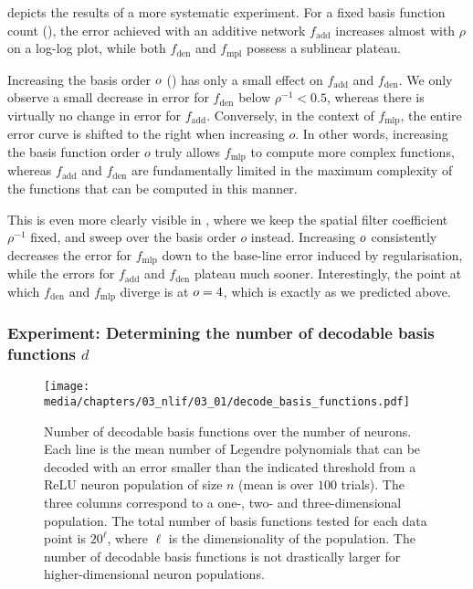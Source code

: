  depicts the results of a more systematic experiment.
For a fixed basis function count (), the error achieved with an additive network $f_\mathrm{add}$ increases almost with $\rho$ on a log-log plot, while both $f_\mathrm{den}$ and $f_\mathrm{mpl}$ possess a sublinear plateau.

Increasing the basis order $o$ () has only a small effect on $f_\mathrm{add}$ and $f_\mathrm{den}$.
We only observe a small decrease in error for $f_\mathrm{den}$ below $\rho^{-1} < 0.5$, whereas there is virtually no change in error for $f_\mathrm{add}$.
Conversely, in the context of $f_\mathrm{mlp}$, the entire error curve is shifted to the right when increasing $o$.
In other words, increasing the basis function order $o$ truly allows $f_\mathrm{mlp}$ to compute more complex functions, whereas $f_\mathrm{add}$ and $f_\mathrm{den}$ are fundamentally limited in the maximum complexity of the functions that can be computed in this manner.

This is even more clearly visible in , where we keep the spatial filter coefficient $\rho^{-1}$ fixed, and sweep over the basis order $o$ instead.
Increasing $o$ consistently decreases the error for $f_\mathrm{mlp}$ down to the base-line error induced by regularisation, while the errors for $f_\mathrm{add}$ and $f_\mathrm{den}$ plateau much sooner.
Interestingly, the point at which $f_\mathrm{den}$ and $f_\mathrm{mlp}$ diverge is at $o = 4$, which is exactly as we predicted above.


\subsubsection{Experiment: Determining the number of decodable basis functions $d$}

\begin{figure}
	\centering
	\texttt{[image: media/chapters/03\_nlif/03\_01/decode\_basis\_functions.pdf]}
	\caption[Number of decodable basis functions over the number of neurons]{Number of decodable basis functions over the number of neurons. Each line is the mean number of Legendre polynomials  that can be decoded with an error smaller than the indicated threshold from a ReLU neuron population of size $n$ (mean is over $100$ trials). The three columns correspond to a one-, two- and three-dimensional population. The total number of basis functions tested for each data point is $20^\ell$, where $\ell$ is the dimensionality of the population.
	The number of decodable basis functions is not drastically larger for higher-dimensional neuron populations.}
	\label{fig:decode_basis_functions}
\end{figure}

